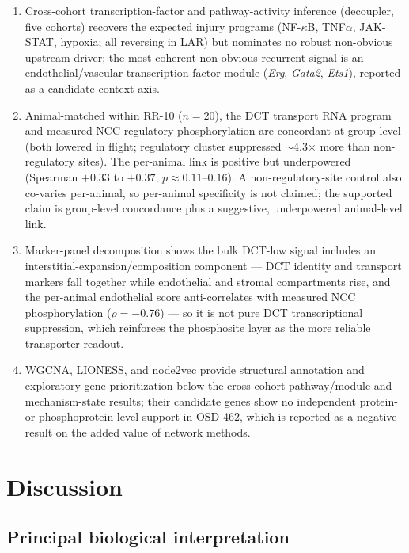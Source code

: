 \documentclass[11pt]{article}
\newcommand{\gene}[1]{\textit{#1}}
\newcommand{\LAR}{LAR\xspace}
\begin{document}
\begin{enumerate}
  \item Cross-cohort transcription-factor and pathway-activity inference (decoupler, five cohorts) recovers the expected injury programs (NF-$\kappa$B, TNF$\alpha$, JAK-STAT, hypoxia; all reversing in \LAR) but nominates no robust non-obvious upstream driver; the most coherent non-obvious recurrent signal is an endothelial/vascular transcription-factor module (\gene{Erg}, \gene{Gata2}, \gene{Ets1}), reported as a candidate context axis.
  \item Animal-matched within RR-10 ($n=20$), the DCT transport RNA program and measured NCC regulatory phosphorylation are concordant at group level (both lowered in flight; regulatory cluster suppressed $\sim$4.3$\times$ more than non-regulatory sites). The per-animal link is positive but underpowered (Spearman $+0.33$ to $+0.37$, $p\approx0.11$--$0.16$). A non-regulatory-site control also co-varies per-animal, so per-animal specificity is not claimed; the supported claim is group-level concordance plus a suggestive, underpowered animal-level link.
  \item Marker-panel decomposition shows the bulk DCT-low signal includes an interstitial-expansion/composition component --- DCT identity and transport markers fall together while endothelial and stromal compartments rise, and the per-animal endothelial score anti-correlates with measured NCC phosphorylation ($\rho=-0.76$) --- so it is not pure DCT transcriptional suppression, which reinforces the phosphosite layer as the more reliable transporter readout.
  \item WGCNA, LIONESS, and node2vec provide structural annotation and exploratory gene prioritization below the cross-cohort pathway/module and mechanism-state results; their candidate genes show no independent protein- or phosphoprotein-level support in OSD-462, which is reported as a negative result on the added value of network methods.
\end{enumerate}

\section{Discussion}

\subsection{Principal biological interpretation}
\end{document}
